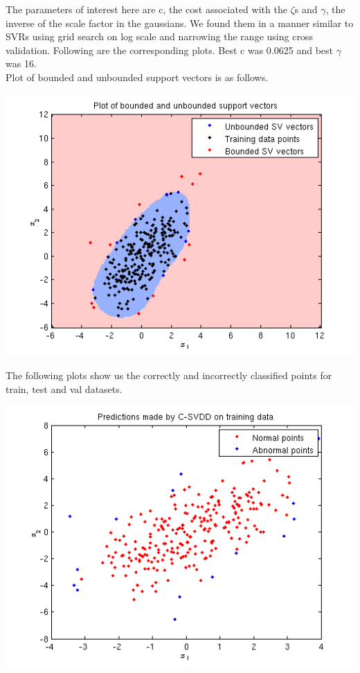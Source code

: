 \documentclass{article}
\begin{document}
The parameters of interest here are c, the cost associated with the $\zeta$s and $\gamma$, the inverse of the scale factor in the gaussians. We found them in a manner similar to SVRs using grid search on log scale and narrowing the range using cross validation. Following are the corresponding plots. Best c was 0.0625 and best $\gamma$ was 16.\\[10pt]
Plot of bounded and unbounded support vectors is as follows.
\begin{center}
\includegraphics[scale=1]{SVDD/c/SV}
\end{center}
The following plots show us the correctly and incorrectly classified points for train, test and val datasets.
\begin{center}
\includegraphics[scale=.8]{SVDD/c/train_plot}
\end{center}
\end{document}
